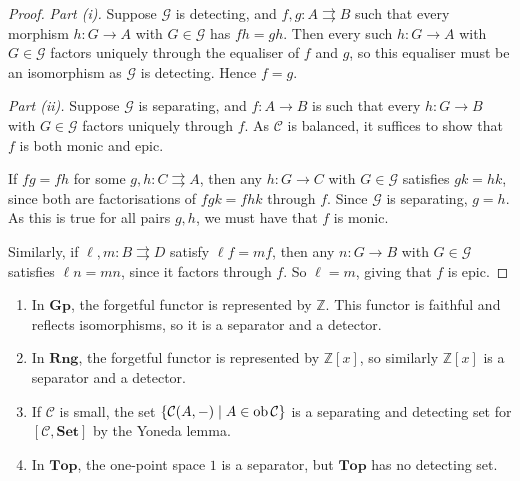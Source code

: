 \begin{proof}
    \emph{Part (i).}
    Suppose \( \mathcal G \) is detecting, and \( f, g : A \rightrightarrows B \) such that every morphism \( h : G \to A \) with \( G \in \mathcal G \) has \( fh = gh \).
    Then every such \( h : G \to A \) with \( G \in \mathcal G \) factors uniquely through the equaliser of \( f \) and \( g \), so this equaliser must be an isomorphism as \( \mathcal G \) is detecting.
    Hence \( f = g \).

    \emph{Part (ii).}
    Suppose \( \mathcal G \) is separating, and \( f : A \to B \) is such that every \( h : G \to B \) with \( G \in \mathcal G \) factors uniquely through \( f \).
    As \( \mathcal C \) is balanced, it suffices to show that \( f \) is both monic and epic.

    If \( fg = fh \) for some \( g, h : C \rightrightarrows A \), then any \( h : G \to C \) with \( G \in \mathcal G \) satisfies \( gk = hk \), since both are factorisations of \( fgk = fhk \) through \( f \).
    Since \( \mathcal G \) is separating, \( g = h \).
    As this is true for all pairs \( g, h \), we must have that \( f \) is monic.
    
    Similarly, if \( \ell, m : B \rightrightarrows D \) satisfy \( \ell f = mf \), then any \( n : G \to B \) with \( G \in \mathcal G \) satisfies \( \ell n = m n \), since it factors through \( f \).
    So \( \ell = m \), giving that \( f \) is epic.
\end{proof}
\begin{example}
    \begin{enumerate}
        \item In \( \mathbf{Gp} \), the forgetful functor is represented by \( \mathbb Z \).
        This functor is faithful and reflects isomorphisms, so it is a separator and a detector.
        \item In \( \mathbf{Rng} \), the forgetful functor is represented by \( \mathbb Z[x] \), so similarly \( \mathbb Z[x] \) is a separator and a detector.
        \item If \( \mathcal C \) is small, the set \( \qty{\mathcal C(A, -) \mid A \in \operatorname{ob}\mathcal C} \) is a separating and detecting set for \( [\mathcal C, \mathbf{Set}] \) by the Yoneda lemma.
        \item In \( \mathbf{Top} \), the one-point space \( 1 \) is a separator, but \( \mathbf{Top} \) has no detecting set.
    \end{enumerate}
\end{example}
